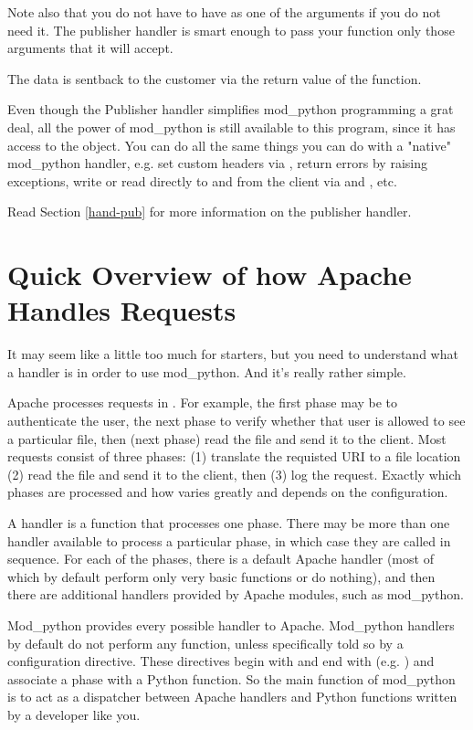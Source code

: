 Note also that you do not have to have  as one of the
arguments if you do not need it. The publisher handler is smart enough
to pass your function only those arguments that it will accept.

The data is sentback to the customer via the return value of the
function.

Even though the Publisher handler simplifies mod_python programming a
grat deal, all the power of mod_python is still available to this
program, since it has access to the  object. You can
do all the same things you can do with a "native" mod_python handler,
e.g. set custom headers via , return errors by
raising  exceptions, write or read
directly to and from the client via  and
, etc.

Read Section \ref{hand-pub} 
for more information on the publisher handler. 

\section{Quick Overview of how Apache Handles Requests\label{tut-overview}}

It may seem like a little too much for starters, but you need to
understand what a handler is in order to use mod_python. And it's
really rather simple.

Apache processes requests in . For example, the first
phase may be to authenticate the user, the next phase to verify
whether that user is allowed to see a particular file, then (next
phase) read the file and send it to the client. Most requests consist
of three phases: (1) translate the requisted URI to a file location
(2) read the file and send it to the client, then (3) log the
request. Exactly which phases are processed and how varies greatly and
depends on the configuration.

A handler is a function that processes one phase. There may be more
than one handler available to process a particular phase, in which
case they are called in sequence. For each of the phases, there is a
default Apache handler (most of which by default perform only very
basic functions or do nothing), and then there are additional handlers
provided by Apache modules, such as mod_python.

Mod_python provides every possible handler to Apache. Mod_python
handlers by default do not perform any function, unless specifically
told so by a configuration directive. These directives begin with
 and end with 
(e.g. ) and associate a phase with a Python
function. So the main function of mod_python is to act as a dispatcher
between Apache handlers and Python functions written by a developer
like you.

